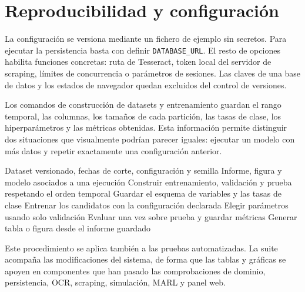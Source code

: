 \section{Reproducibilidad y configuración}

La configuración se versiona mediante un fichero de ejemplo sin secretos. Para ejecutar la persistencia basta con definir \texttt{DATABASE\_URL}. El resto de opciones habilita funciones concretas: ruta de Tesseract, token local del servidor de scraping, límites de concurrencia o parámetros de sesiones. Las claves de una base de datos y los estados de navegador quedan excluidos del control de versiones.

Los comandos de construcción de datasets y entrenamiento guardan el rango temporal, las columnas, los tamaños de cada partición, las tasas de clase, los hiperparámetros y las métricas obtenidas. Esta información permite distinguir dos situaciones que visualmente podrían parecer iguales: ejecutar un modelo con más datos y repetir exactamente una configuración anterior.

\begin{algorithm}[H]
\caption{Ejecución de experimento.}
\label{alg:experimento-reproducible}
\begin{algorithmic}[1]
\Require Dataset versionado, fechas de corte, configuración y semilla
\Ensure Informe, figura y modelo asociados a una ejecución
\State Construir entrenamiento, validación y prueba respetando el orden temporal
\State Guardar el esquema de variables y las tasas de clase
\State Entrenar los candidatos con la configuración declarada
\State Elegir parámetros usando solo validación
\State Evaluar una vez sobre prueba y guardar métricas
\State Generar tabla o figura desde el informe guardado
\end{algorithmic}
\end{algorithm}

Este procedimiento se aplica también a las pruebas automatizadas. La suite acompaña las modificaciones del sistema, de forma que las tablas y gráficas se apoyen en componentes que han pasado las comprobaciones de dominio, persistencia, OCR, scraping, simulación, MARL y panel web.
